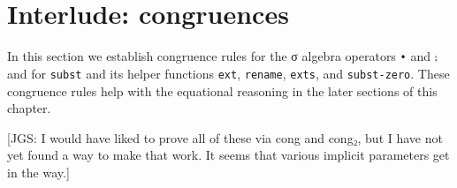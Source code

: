 \begin{fence}
\begin{code}%
\>[0]%
\>[486I]\AgdaSymbol{:}\AgdaSpace{}%
\AgdaSpace{}%
\AgdaSymbol{\}}\AgdaSpace{}%
\AgdaSymbol{\{}\AgdaSpace{}%
\AgdaSymbol{:}\AgdaSpace{}%
\AgdaSpace{}%
\AgdaSpace{}%
\AgdaSymbol{\}}\AgdaSpace{}%
\AgdaSymbol{\{}\AgdaSpace{}%
\AgdaSymbol{:}\AgdaSpace{}%
\AgdaSpace{}%
\AgdaSpace{}%
\AgdaSymbol{\}\{}\AgdaSpace{}%
\AgdaSymbol{:}\AgdaSpace{}%
\AgdaSpace{}%
\AgdaSpace{}%
\AgdaSymbol{\}}\<%
\\
\>[.][@{}l@{}]\<[486I]%
\>[8]\AgdaSpace{}%
\AgdaSpace{}%
\AgdaSpace{}%
\AgdaSpace{}%
\AgdaSymbol{(}\AgdaSpace{}%
\AgdaSpace{}%
\AgdaSymbol{)}%
\>[25]\AgdaSpace{}%
\AgdaSymbol{(}\AgdaSpace{}%
\AgdaSpace{}%
\AgdaSpace{}%
\AgdaSymbol{)}\AgdaSpace{}%
\AgdaSpace{}%
\AgdaSymbol{(}\AgdaSpace{}%
\AgdaSpace{}%
\AgdaSpace{}%
\AgdaSymbol{)}\<%
\\
\>[0]\AgdaSpace{}%
\AgdaSymbol{=}\AgdaSpace{}%
\<%
\end{code}
\end{fence}

\hypertarget{interlude-congruences}{%
\section{Interlude: congruences}\label{interlude-congruences}}

In this section we establish congruence rules for the σ algebra
operators \texttt{•} and \texttt{⨟} and for \texttt{subst} and its
helper functions \texttt{ext}, \texttt{rename}, \texttt{exts}, and
\texttt{subst-zero}. These congruence rules help with the equational
reasoning in the later sections of this chapter.

{[}JGS: I would have liked to prove all of these via cong and cong₂, but
I have not yet found a way to make that work. It seems that various
implicit parameters get in the way.{]}

